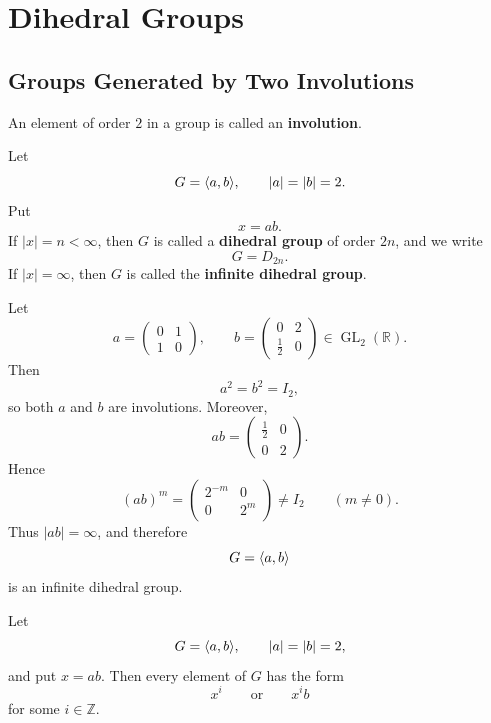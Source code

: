 \chapter{Dihedral Groups}

\section{Groups Generated by Two Involutions}

\begin{definition}[Involution]
An element of order $2$ in a group is called an \textbf{involution}.
\end{definition}

\begin{definition}
Let
\[
    G=\langle a,b\rangle,
    \qquad
    |a|=|b|=2.
\]
Put
\[
    x=ab.
\]
If $|x|=n<\infty$, then $G$ is called a \textbf{dihedral group} of order $2n$, and we write
\[
    G=D_{2n}.
\]
If $|x|=\infty$, then $G$ is called the \textbf{infinite dihedral group}.
\end{definition}

\begin{example}
Let
\[
    a=
    \begin{pmatrix}
        0 & 1\\
        1 & 0
    \end{pmatrix},
    \qquad
    b=
    \begin{pmatrix}
        0 & 2\\
        \frac12 & 0
    \end{pmatrix}
    \in \operatorname{GL}_2(\mathbb R).
\]
Then
\[
    a^2=b^2=I_2,
\]
so both $a$ and $b$ are involutions. Moreover,
\[
    ab=
    \begin{pmatrix}
        \frac12 & 0\\
        0 & 2
    \end{pmatrix}.
\]
Hence
\[
    (ab)^m=
    \begin{pmatrix}
        2^{-m} & 0\\
        0 & 2^m
    \end{pmatrix}\neq I_2
    \qquad(m\neq 0).
\]
Thus $|ab|=\infty$, and therefore
\[
    G=\langle a,b\rangle
\]
is an infinite dihedral group.
\end{example}

\begin{proposition}
Let
\[
    G=\langle a,b\rangle,
    \qquad
    |a|=|b|=2,
\]
and put $x=ab$. Then every element of $G$ has the form
\[
    x^i
    \qquad\text{or}\qquad
    x^i b
\]
for some $i\in\mathbb Z$.
\end{proposition}

